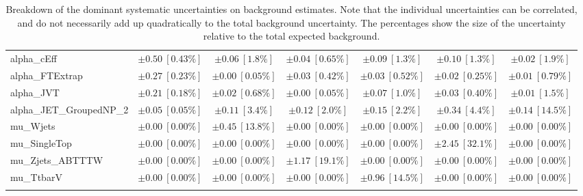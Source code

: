 \begin{sidewaystable}
\begin{center}
\begin{tabular*}{\textwidth}{@{\extracolsep{\fill}}lcccccc}
alpha\_cEff         & $\pm 0.50\ [0.43\%] $          & $\pm 0.06\ [1.8\%] $          & $\pm 0.04\ [0.65\%] $          & $\pm 0.09\ [1.3\%] $          & $\pm 0.10\ [1.3\%] $          & $\pm 0.02\ [1.9\%] $       \\
alpha\_FTExtrap         & $\pm 0.27\ [0.23\%] $          & $\pm 0.00\ [0.05\%] $          & $\pm 0.03\ [0.42\%] $          & $\pm 0.03\ [0.52\%] $          & $\pm 0.02\ [0.25\%] $          & $\pm 0.01\ [0.79\%] $       \\
alpha\_JVT         & $\pm 0.21\ [0.18\%] $          & $\pm 0.02\ [0.68\%] $          & $\pm 0.00\ [0.05\%] $          & $\pm 0.07\ [1.0\%] $          & $\pm 0.03\ [0.40\%] $          & $\pm 0.01\ [1.5\%] $       \\
alpha\_JET\_GroupedNP\_2         & $\pm 0.05\ [0.05\%] $          & $\pm 0.11\ [3.4\%] $          & $\pm 0.12\ [2.0\%] $          & $\pm 0.15\ [2.2\%] $          & $\pm 0.34\ [4.4\%] $          & $\pm 0.14\ [14.5\%] $       \\
mu\_Wjets         & $\pm 0.00\ [0.00\%] $          & $\pm 0.45\ [13.8\%] $          & $\pm 0.00\ [0.00\%] $          & $\pm 0.00\ [0.00\%] $          & $\pm 0.00\ [0.00\%] $          & $\pm 0.00\ [0.00\%] $       \\
mu\_SingleTop         & $\pm 0.00\ [0.00\%] $          & $\pm 0.00\ [0.00\%] $          & $\pm 0.00\ [0.00\%] $          & $\pm 0.00\ [0.00\%] $          & $\pm 2.45\ [32.1\%] $          & $\pm 0.00\ [0.00\%] $       \\
mu\_Zjets\_ABTTTW         & $\pm 0.00\ [0.00\%] $          & $\pm 0.00\ [0.00\%] $          & $\pm 1.17\ [19.1\%] $          & $\pm 0.00\ [0.00\%] $          & $\pm 0.00\ [0.00\%] $          & $\pm 0.00\ [0.00\%] $       \\
mu\_TtbarV         & $\pm 0.00\ [0.00\%] $          & $\pm 0.00\ [0.00\%] $          & $\pm 0.00\ [0.00\%] $          & $\pm 0.96\ [14.5\%] $          & $\pm 0.00\ [0.00\%] $          & $\pm 0.00\ [0.00\%] $       \\
\noalign{\smallskip}\hline\noalign{\smallskip}
\end{tabular*}
\end{center}
\caption[Breakdown of uncertainty on background estimates]{
Breakdown of the dominant systematic uncertainties on background estimates.
Note that the individual uncertainties can be correlated, and do not necessarily add up quadratically to 
the total background uncertainty. The percentages show the size of the uncertainty relative to the total expected background.
\label{table.results.bkgestimate.uncertainties.VRTopBTT_bybkg}}
\end{sidewaystable}
%